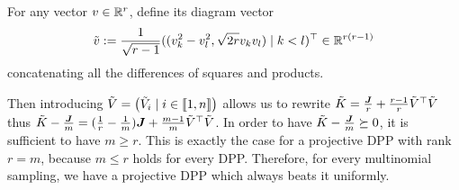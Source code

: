 For any vector $v \in \mathbb{R}^{r}$, \cite{copenhaver2013diagramvectors} define its diagram vector 
$$\tilde v :=
 \frac{1}{\sqrt{r-1}} ((v_k^{2}-v_l^{2} , \sqrt{2 r} v_k v_l ) \mid k<l)^\top \in \mathbb{R}^{r(r-1)}$$
concatenating all the differences of squares and products.

Then introducing $\tilde V = \begin{pmatrix}\tilde V_i \mid i\in\llbracket 1,n \rrbracket\end{pmatrix}
$ allows us to rewrite $\tilde K = \frac{\boldsymbol{J}}{r} + \frac{r-1}{r} \tilde V^\top \tilde V$ thus $\tilde K - \frac{\boldsymbol{J}}{m} = (\frac{1}{r}-\frac{1}{m})\boldsymbol{J} + \frac{m-1}{m} \tilde V^\top \tilde V$. In order to have $\tilde K - \frac{\boldsymbol{J}}{m}\succeq 0$, it is sufficient to have $m \geq r$. This is exactly the case for a projective DPP with rank $r = m$, because $m \leq r$ holds for every DPP. Therefore, for every multinomial sampling, we have a projective DPP which always beats it uniformly.



